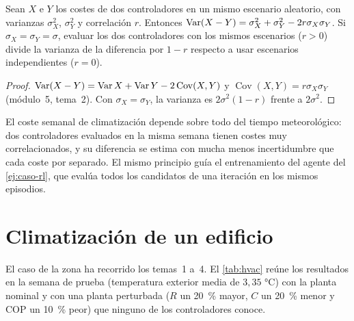 \begin{proposicion}\label{prop:crn}
Sean $X$ e $Y$ los costes de dos controladores en un mismo escenario aleatorio, con varianzas $\sigma_X^{2}$, $\sigma_Y^{2}$ y correlación $r$. Entonces $\operatorname{Var}(X-Y)=\sigma_X^{2}+\sigma_Y^{2}-2r\sigma_X\sigma_Y$. Si $\sigma_X=\sigma_Y=\sigma$, evaluar los dos controladores con los mismos escenarios ($r>0$) divide la varianza de la diferencia por $1-r$ respecto a usar escenarios independientes ($r=0$).
\end{proposicion}

\begin{proof}
$\operatorname{Var}(X-Y)=\operatorname{Var} X+\operatorname{Var} Y-2\operatorname{Cov}(X,Y)$ y $\operatorname{Cov}(X,Y)=r\sigma_X\sigma_Y$ (módulo~5, tema~2). Con $\sigma_X=\sigma_Y$, la varianza es $2\sigma^{2}(1-r)$ frente a $2\sigma^{2}$.
\end{proof}

El coste semanal de climatización depende sobre todo del tiempo meteorológico: dos controladores evaluados en la misma semana tienen costes muy correlacionados, y su diferencia se estima con mucha menos incertidumbre que cada coste por separado. El mismo principio guía el entrenamiento del agente del \cref{ej:caso-rl}, que evalúa todos los candidatos de una iteración en los mismos episodios.

\section{Climatización de un edificio}

El caso de la zona ha recorrido los temas~1 a~4. El \cref{tab:hvac} reúne los resultados en la semana de prueba (temperatura exterior media de $3{,}35$ °C) con la planta nominal y con una planta perturbada ($R$ un 20~\% mayor, $C$ un 20~\% menor y COP un 10~\% peor) que ninguno de los controladores conoce.

